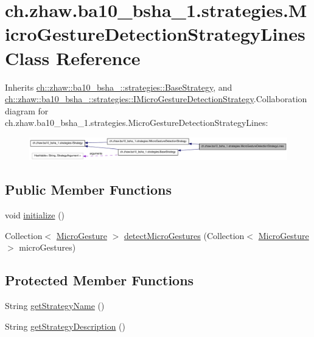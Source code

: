 \hypertarget{classch_1_1zhaw_1_1ba10__bsha__1_1_1strategies_1_1MicroGestureDetectionStrategyLines}{
\section{ch.zhaw.ba10\_\-bsha\_\-1.strategies.MicroGestureDetectionStrategyLines Class Reference}
\label{classch_1_1zhaw_1_1ba10__bsha__1_1_1strategies_1_1MicroGestureDetectionStrategyLines}
}


Inherits \hyperlink{classch_1_1zhaw_1_1ba10__bsha__1_1_1strategies_1_1BaseStrategy}{ch::zhaw::ba10\_\-bsha\_::strategies::BaseStrategy}, and \hyperlink{interfacech_1_1zhaw_1_1ba10__bsha__1_1_1strategies_1_1IMicroGestureDetectionStrategy}{ch::zhaw::ba10\_\-bsha\_::strategies::IMicroGestureDetectionStrategy}.Collaboration diagram for ch.zhaw.ba10\_\-bsha\_\-1.strategies.MicroGestureDetectionStrategyLines:\nopagebreak
\begin{figure}[H]
\begin{center}
\leavevmode
\includegraphics[width=400pt]{classch_1_1zhaw_1_1ba10__bsha__1_1_1strategies_1_1MicroGestureDetectionStrategyLines__coll__graph}
\end{center}
\end{figure}
\subsection*{Public Member Functions}
\begin{DoxyCompactItemize}
\item 
void \hyperlink{classch_1_1zhaw_1_1ba10__bsha__1_1_1strategies_1_1MicroGestureDetectionStrategyLines_a17861d2a4eaa204c4dc86de1633c0f8c}{initialize} ()
\item 
Collection$<$ \hyperlink{classch_1_1zhaw_1_1ba10__bsha__1_1_1service_1_1MicroGesture}{MicroGesture} $>$ \hyperlink{classch_1_1zhaw_1_1ba10__bsha__1_1_1strategies_1_1MicroGestureDetectionStrategyLines_ac4a6ad22e6ca3b595006c0b956fdd208}{detectMicroGestures} (Collection$<$ \hyperlink{classch_1_1zhaw_1_1ba10__bsha__1_1_1service_1_1MicroGesture}{MicroGesture} $>$ microGestures)
\end{DoxyCompactItemize}
\subsection*{Protected Member Functions}
\begin{DoxyCompactItemize}
\item 
String \hyperlink{classch_1_1zhaw_1_1ba10__bsha__1_1_1strategies_1_1MicroGestureDetectionStrategyLines_a9e856240313caac95a363e99bfac2474}{getStrategyName} ()
\item 
String \hyperlink{classch_1_1zhaw_1_1ba10__bsha__1_1_1strategies_1_1MicroGestureDetectionStrategyLines_a268ab1d51d959092f2d9a68044cc818d}{getStrategyDescription} ()
\end{DoxyCompactItemize}

